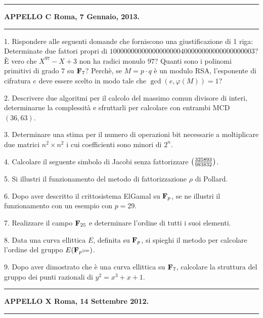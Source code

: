 \hrule
\centerline{{\bf APPELLO C \hfill Roma, 7 Gennaio, 2013.}}\hrule
\item{1.} Rispondere alle seguenti domande che forniscono una giustificazione di 1 riga:
 Determinate due fattori propri di $10000000000000000000400000000000000000003$?
 \`E vero che $X^{97}-X+3$ non ha radici monulo $97$?
 Quanti sono i polinomi primitivi di grado $7$ su ${\bf F}_7$?
 Perch\`e, se $M=p\cdot q$ \`e un modulo RSA, l'esponente
di cifratura $e$ deve essere scelto in modo tale che $\gcd(e,\varphi(M))=1$?
\item{2.} Descrivere due algoritmi per il calcolo del massimo comun divisore di interi, determinarne la complessit\`a e sfruttarli
per calcolare con entrambi MCD$(36,63)$.
\item{3.} Determinare una stima per il numero di operazioni bit necessarie a moltiplicare due matrici $n^2\times n^2$ 
i cui coefficienti sono minori di $2^n$.
\item{4.} Calcolare il seguente simbolo di Jacobi senza fattorizzare
$\left({325893\over983832}\right)$.
\item{5.} Si illustri il funzionamento del metodo di fattorizzazione $\rho$ di  Pollard.
\item{6.} Dopo aver descritto il crittosistema ElGamal su ${\bf F}_p$, se ne illustri il funzionamento con un esempio con $p = 29$.
\item{7.} Realizzare il campo ${\bf F}_{25}$ e determinare l'ordine di tutti i suoi elementi.
\item{8.} Data una curva ellittica $E$, definita su ${\bf F}_p$, si spieghi il metodo per calcolare l'ordine
del gruppo $E({\bf F}_{p^{100}})$.
\item{9.} Dopo aver dimostrato che \`e una curva ellittica su ${\bf F}_7$, 
calcolare la struttura del gruppo dei punti razionali di $y^2 = x^3 + x + 1$.
\bigskip

\hrule
\centerline{{\bf APPELLO X \hfill Roma, 14 Settembre 2012.}}\hrule

